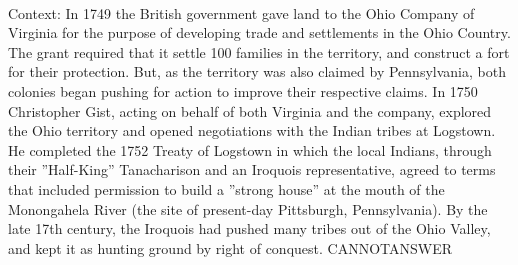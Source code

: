 \documentclass[11pt,a4paper, onecolumn]{article}
\begin{document}
\\ Context: In 1749 the British government gave land to the Ohio Company of Virginia for the purpose of developing trade and settlements in the Ohio Country. The grant required that it settle 100 families in the territory, and construct a fort for their protection. But, as the territory was also claimed by Pennsylvania, both colonies began pushing for action to improve their respective claims. In 1750 Christopher Gist, acting on behalf of both Virginia and the company, explored the Ohio territory and opened negotiations with the Indian tribes at Logstown. He completed the 1752 Treaty of Logstown in which the local Indians, through their ''Half-King'' Tanacharison and an Iroquois representative, agreed to terms that included permission to build a ''strong house'' at the mouth of the Monongahela River (the site of present-day Pittsburgh, Pennsylvania). By the late 17th century, the Iroquois had pushed many tribes out of the Ohio Valley, and kept it as hunting ground by right of conquest. CANNOTANSWER
\end{document}
